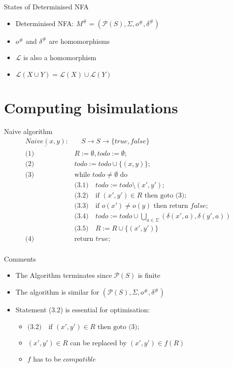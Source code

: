 \documentclass[compress]{beamer}
\begin{document}
\begin{frame}{States of Determinised NFA}
  \begin{itemize}
    \item Determinised NFA: $M^\# = (\mathcal{P}(S), \Sigma, o^\#, \delta^\#)$
    \item $o^\#$ and $\delta^\#$ are homomorphisms
    \item $\mathcal{L}$ is also a homomorphism
    \item $\mathcal{L}(X \cup Y) = \mathcal{L}({X}) \cup \mathcal{L}({Y})$
  \end{itemize}
\end{frame}

\section{Computing bisimulations}

\begin{frame}{Naive algorithm}
  \begin{align*}
    \underline{Naive(x, y)}: &\quad S \to S \to \{true, false\} \\
    \text{(1) } & R := \emptyset, todo := \emptyset;\\
    \text{(2) } & todo := todo \cup \{(x, y)\};\\
    \text{(3) } & \text{while } todo \neq \emptyset \text{ do}\\
      & \text{(3.1)}\quad todo := todo \setminus (x', y');\\
      & \text{(3.2)}\quad \text{if } (x', y') \in R \text{ then goto (3)};\\
      & \text{(3.3)}\quad \text{if } o(x') \neq o(y) \text{ then return } false;\\
      & \text{(3.4)}\quad todo := todo \cup \bigcup_{a \in \Sigma}{(\delta(x', a), \delta(y', a))} \\
      & \text{(3.5)}\quad R := R \cup \{(x', y')\} \\
    \text{(4) } & \text{return } true;\\
  \end{align*}
\end{frame}

\begin{frame}{Comments}
  \begin{itemize}
    \item The Algorithm terminates since $\mathcal{P}(S)$ is finite
    \item The algorithm is similar for $(\mathcal{P}(S), \Sigma, o^\#, \delta^\#)$
    \item Statement (3.2) is essential for optimisation:\\
      \begin{itemize}
        \item $\text{(3.2)}\quad \text{if } (x', y') \in R \text{ then goto (3)};$
        \item $(x', y') \in R$ can be replaced by $(x', y') \in f(R)$
        \item $f$ has to be $compatible$
      \end{itemize}
  \end{itemize}
\end{frame}
\end{document}
